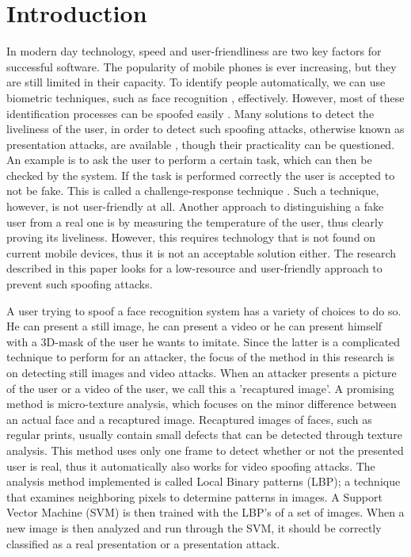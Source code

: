 \documentclass{sig-alternate-br}
\begin{document}
\section{Introduction} \label{introduction}
In modern day technology, speed and user-friendliness are two key factors for successful software. The popularity of mobile phones is ever increasing, but they are still limited in their capacity. To identify people automatically, we can use biometric techniques, such as face recognition \cite{zhao2003face}, effectively. However, most of these identification processes can be spoofed easily \cite{anjos2014face}. Many solutions to detect the liveliness of the user, in order to detect such spoofing attacks, otherwise known as presentation attacks, are available \cite{bao2009liveness}, though their practicality can be questioned. An example is to ask the user to perform a certain task, which can then be checked by the system. If the task is performed correctly the user is accepted to not be fake. This is called a challenge-response technique \cite{bolle2005system}. Such a technique, however, is not user-friendly at all. Another approach to distinguishing a fake user from a real one is by measuring the temperature of the user, thus clearly proving its liveliness. However, this requires technology that is not found on current mobile devices, thus it is not an acceptable solution either. The research described in this paper looks for a low-resource and user-friendly approach to prevent such spoofing attacks.

A user trying to spoof a face recognition system has a variety of choices to do so. He can present a still image, he can present a video or he can present himself with a 3D-mask of the user he wants to imitate. Since the latter is a complicated technique to perform for an attacker, the focus of the method in this research is on detecting still images and video attacks. When an attacker presents a picture of the user or a video of the user, we call this a 'recaptured image'. A promising method is micro-texture analysis, which focuses on the minor difference between an actual face and a recaptured image. Recaptured images of faces, such as regular prints, usually contain small defects that can be detected through texture analysis. This method uses only one frame to detect whether or not the presented user is real, thus it automatically also works for video spoofing attacks. The analysis method implemented is called Local Binary patterns (LBP); a technique that examines neighboring pixels to determine patterns in images. A Support Vector Machine (SVM) is then trained with the LBP's of a set of images. When a new image is then analyzed and run through the SVM, it should be correctly classified as a real presentation or a presentation attack.
\end{document}
